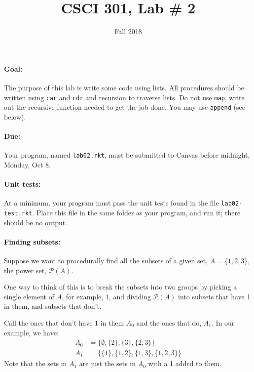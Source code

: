 \documentclass{article}
\title{CSCI 301, Lab \# 2}
\author{Fall 2018}
\date{}
\newcommand{\set}[1]{\ensuremath{\{#1\}}}
\newcommand{\power}[1]{\ensuremath{\mathcal{P}(#1)}}
\begin{document}
\maketitle


\paragraph{Goal:} The purpose of this lab is write some  code 
 using lists.  All procedures should be written using {\tt car} and
 {\tt cdr} and recursion to traverse lists.  Do not use {\tt map},
 write out the recursive function needed to get the job done.  You may
 use {\tt append} (see below).

\paragraph{Due:} Your program, named {\tt lab02.rkt}, must be submitted to
  Canvas before midnight, Monday, Oct 8.

  \paragraph{Unit tests:}
  At a minimum, your program must pass the unit tests found in the
  file {\tt lab02-test.rkt}.  Place this file in the same folder
  as your program, and run it;  there should be no output.

\paragraph{Finding subsets:}  Suppose we want to procedurally find all
the subsets of a given set, $A=\set{1,2,3}$, the power set,
$\mathcal{P}(A)$.

One way to think of this is to break the subsets
into two groups by picking a single element of $A$, for example, 1,
and dividing \power{A} into subsets that have 1 in them, and subsets that
don't.

Call the ones that don't have 1 in them $A_0$ and the ones
that do, $A_1$.  In our example, we have:
\begin{align*}
A_0 &= \set{\emptyset,\set{2},\set{3},\set{2,3}}\\
A_1 &= \set{\set{1},\set{1,2},\set{1,3},\set{1,2,3}}
\end{align*}
Note that the sets in $A_1$ are just the sets in $A_0$ with a 1 added
to them.
\end{document}
